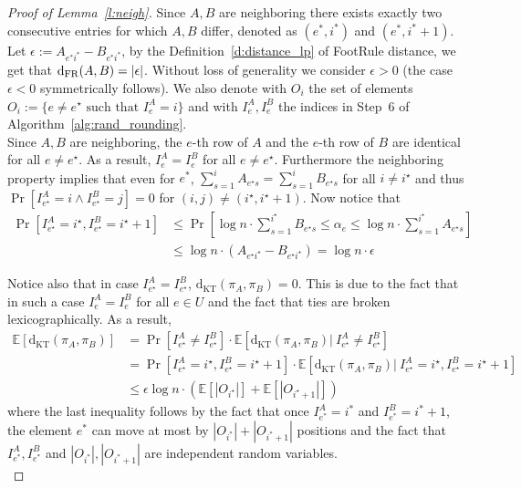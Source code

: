\begin{proof}[Proof of Lemma~\ref{l:neigh}]
Since $A,B$ are neighboring there
exists exactly two consecutive entries for which $A,B$ differ, denoted as $(e^\ast,i^\ast)$ and $(e^\ast,i^\ast+1)$. Let $\epsilon := A_{e^\ast i^\ast} - B_{e^\ast i^\ast }$, by the  Definition~\ref{d:distance_lp} of FootRule distance, we get that $\mathrm{d}_{\mathrm{FR}}(A,B) = |\epsilon|$. Without loss of generality we consider $\epsilon >0$ (the case $\epsilon <0$ symmetrically follows). We also denote with $O_i$ the set of elements $O_i := \{e \neq e^\star \text{ such that } I_e^A = i\}$ and with $I_e^A,I_e^B$ the indices in Step~$6$ of Algorithm~\ref{alg:rand_rounding}.\\

\noindent Since $A,B$ are neighboring, the $e$-th row of $A$ and the $e$-th row of $B$ are identical for all $e \neq e^\star$. As a result, $I_e^A = I_e^B$ for all $e \neq e^\star$. Furthermore the neighboring property implies that
even for $e^\ast$, $\sum_{s=1}^i A_{e^\star s} = \sum_{s=1}^i B_{e^\star s}$ for all $i \neq i^\star$ and thus $\Pr \left[ I_{e^\star}^A=i \wedge I_{e^\star}^B = j \right] = 0$ for $(i,j) \neq (i^\star,i^\star+1)$. Now notice that
\begin{align*}
\Pr\left[ I_{e^\star}^A=i^\star, I_{e^\star}^B = i^\star + 1 \right] &\leq 
\Pr\left [ \log n \cdot \sum_{s=1}^{i^\star} B_{e^\star s}
\leq \alpha_e \leq \log n \cdot \sum_{s=1}^{i^\star} A_{e^\star s} \right] \\
&\leq 
\log n \cdot \left( A_{e^\star i ^\star} -  B_{e^\star i ^\star}\right)  = \log n \cdot \epsilon
\end{align*}

\noindent Notice also that in case $I_{e^\star}^A  = I_{e^\star}^B$, $\mathrm{d}_{\mathrm{KT}}(\pi_A,\pi_B) = 0$. This is due to the fact that in such a case $I_e^A = I_e^B$ for all $e \in U$ and the fact that ties are broken lexicographically. As a result,
\begin{align*}
 \mathbb{E}\left[\mathrm{d}_{\mathrm{KT}}(\pi_A,\pi_B) \right] &= \Pr\left[ I_{e^\star}^A \neq I_{e^\star}^B\right] \cdot \mathbb{E}\left[\mathrm{d}_{\mathrm{KT}}(\pi_A,\pi_B)|~ I_{e^\star}^A \neq I_{e^\star}^B\right]\\
&=\Pr[ I_{e^\star}^A=i^\star, I_{e^\star}^B = i^\star + 1 ] \cdot \mathbb{E}\left[\mathrm{d}_{\mathrm{KT}}(\pi_A,\pi_B)|~ I_{e^\star}^A=i^\star, I_{e^\star}^B =i^\star + 1\right]\\ 
&\leq \epsilon \log n \cdot \left( \mathbb{E}\left[|O_{i^\star}|\right] + \mathbb{E}\left[|O_{i^\star + 1}|\right] \right)
\end{align*}
where the last inequality follows by the fact that once $I_{e^\ast}^A = i^\ast$ and $I_{e^\ast}^B = i^\ast + 1$, the element $e^\ast$ can move at most by $|O_{i^\ast}| + |O_{i^\ast+1}|$ positions and the fact that $I_{e^\ast}^A,I_{e^\ast}^B$ and $|O_{i^\ast}|,|O_{i^\ast+1}|$ are independent random variables.\\


\end{proof}
